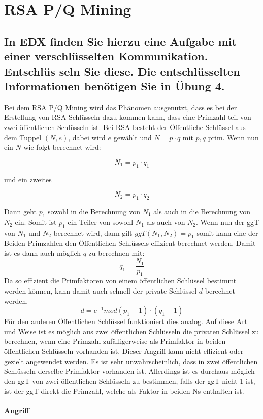 \section{RSA P/Q Mining}
\subsection{ In EDX finden Sie hierzu eine Aufgabe mit einer verschlüsselten Kommunikation. Entschlüs
seln Sie diese. Die entschlüsselten Informationen benötigen Sie in Übung 4.}
Bei dem RSA P/Q Mining wird das Phänomen ausgenutzt, dass es bei der Erstellung von RSA Schlüsseln dazu kommen kann, dass eine Primzahl teil von zwei öffentlichen Schlüsseln ist. Bei RSA besteht der Öffentliche Schlüssel aus dem Tuppel $(N,e)$, dabei wird $e$ gewählt und $N = p \cdot q$ mit $p,q$ prim. Wenn nun ein $N$ wie folgt berechnet wird:

$$N_1=p_1 \cdot q_1$$

und ein zweites 

$$N_2=p_1 \cdot q_2$$

Dann geht $p_1$ sowohl in die Berechnung von $N_1$ als auch in die Berechnung von $N_2$ ein. Somit ist $p_1$ ein Teiler von sowohl $N_1$ als auch von $N_2$. Wenn nun der ggT von $N_1$ und $N_2$ berechnet wird, dann gilt $ggT(N_1,N_2) = p_1$ somit kann eine der Beiden Primzahlen den Öffentlichen Schlüssels effizient berechnet werden. Damit ist es dann auch möglich $q$ zu berechnen mit: $$q_1 =\frac{N_1}{p_1}$$
Da so effizient die Primfaktoren von einem öffentlichen Schlüssel bestimmt werden können, kann damit auch schnell der private Schlüssel $d$ berechnet werden.
$$
d = e^{-1} mod (p_1 - 1) \cdot (q_1 -1)
$$
Für den anderen Öffentlichen Schlüssel funktioniert dies analog.
Auf diese Art und Weise ist es möglich aus zwei öffentlichen Schlüsseln die privaten Schlüssel zu berechnen, wenn eine Primzahl zufälligerweise als Primfaktor in beiden öffentlichen Schlüsseln vorhanden ist. 
Dieser Angriff kann nicht effizient oder gezielt angewendet werden. Es ist sehr unwahrscheinlich, dass in zwei öffentlichen Schlüsseln derselbe Primfaktor vorhanden ist. Allerdings ist es durchaus möglich den ggT von zwei öffentlichen Schlüsseln zu bestimmen, falls der ggT nicht 1 ist, ist der ggT direkt die Primzahl, welche als Faktor in beiden Ns enthalten ist.

\paragraph{Angriff}

